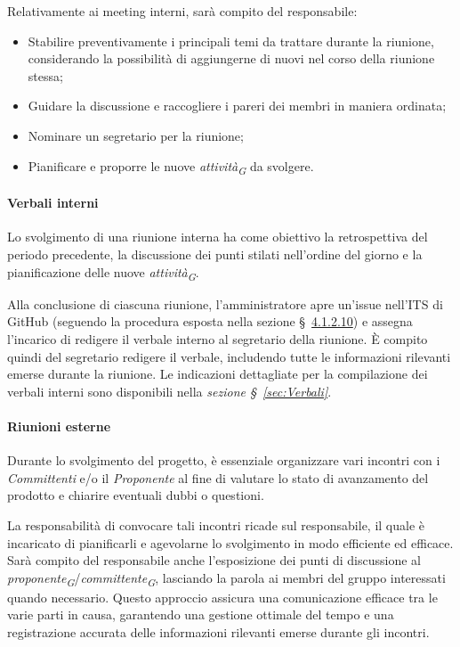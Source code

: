 \vspace{0,1cm}

Relativamente ai meeting interni, sarà compito del responsabile:
\begin{itemize}
		\item Stabilire preventivamente i principali temi da trattare durante la riunione, considerando la possibilità di aggiungerne di nuovi nel corso della riunione stessa;
		\item Guidare la discussione e raccogliere i pareri dei membri in maniera ordinata;
		\item Nominare un segretario per la riunione;
		\item Pianificare e proporre le nuove \textit{attività}\textsubscript{\textit{G}} da svolgere.
\end{itemize}

\hypertarget{par:verbaliInterni}{\paragraph*{Verbali interni}}
Lo svolgimento di una riunione interna ha come obiettivo la retrospettiva del periodo precedente, la discussione dei punti stilati nell'ordine del giorno e la pianificazione delle nuove \textit{attività}\textsubscript{\textit{G}}.

Alla conclusione di ciascuna riunione, l'amministratore apre un'issue nell'ITS di GitHub (seguendo la procedura esposta nella sezione \S~\hyperlink{par:ticketing}{4.1.2.10}) e assegna l'incarico di redigere il verbale interno al segretario della riunione. È compito quindi del segretario redigere il verbale, includendo tutte le informazioni rilevanti emerse durante la riunione. Le indicazioni dettagliate per la compilazione dei verbali interni sono disponibili nella \textit{sezione \S~\ref{sec:Verbali}}.

\paragraph{Riunioni esterne}
Durante lo svolgimento del progetto, è essenziale organizzare vari incontri con i \textit{Committenti} e/o il \textit{Proponente} al fine di valutare lo stato di avanzamento del prodotto e chiarire eventuali dubbi o questioni.

\vspace{0.2cm}

La responsabilità di convocare tali incontri ricade sul responsabile, il quale è incaricato di pianificarli e agevolarne lo svolgimento in modo efficiente ed efficace. \\
Sarà compito del responsabile anche l'esposizione dei punti di discussione al \textit{proponente}\textsubscript{\textit{G}}/\textit{committente}\textsubscript{\textit{G}}, lasciando la parola ai membri del gruppo interessati quando necessario. Questo approccio assicura una comunicazione efficace tra le varie parti in causa, garantendo una gestione ottimale del tempo e una registrazione accurata delle informazioni rilevanti emerse durante gli incontri.

